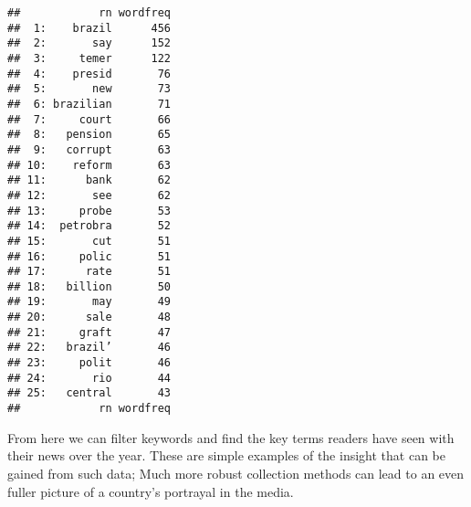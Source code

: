 \documentclass[]{article}
\newenvironment{Shaded}{\begin{snugshade}}{\end{snugshade}}
\newcommand{\KeywordTok}[1]{\textcolor[rgb]{0.13,0.29,0.53}{\textbf{#1}}}
\newcommand{\DataTypeTok}[1]{\textcolor[rgb]{0.13,0.29,0.53}{#1}}
\newcommand{\DecValTok}[1]{\textcolor[rgb]{0.00,0.00,0.81}{#1}}
\newcommand{\StringTok}[1]{\textcolor[rgb]{0.31,0.60,0.02}{#1}}
\newcommand{\CommentTok}[1]{\textcolor[rgb]{0.56,0.35,0.01}{\textit{#1}}}
\newcommand{\OperatorTok}[1]{\textcolor[rgb]{0.81,0.36,0.00}{\textbf{#1}}}
\newcommand{\NormalTok}[1]{#1}
\begin{document}
\begin{Shaded}
\end{Shaded}

\begin{verbatim}
##            rn wordfreq
##  1:    brazil      456
##  2:       say      152
##  3:     temer      122
##  4:    presid       76
##  5:       new       73
##  6: brazilian       71
##  7:     court       66
##  8:   pension       65
##  9:   corrupt       63
## 10:    reform       63
## 11:      bank       62
## 12:       see       62
## 13:     probe       53
## 14:  petrobra       52
## 15:       cut       51
## 16:     polic       51
## 17:      rate       51
## 18:   billion       50
## 19:       may       49
## 20:      sale       48
## 21:     graft       47
## 22:   brazil’       46
## 23:     polit       46
## 24:       rio       44
## 25:   central       43
##            rn wordfreq
\end{verbatim}

From here we can filter keywords and find the key terms readers have
seen with their news over the year. These are simple examples of the
insight that can be gained from such data; Much more robust collection
methods can lead to an even fuller picture of a country's portrayal in
the media.
\end{document}
